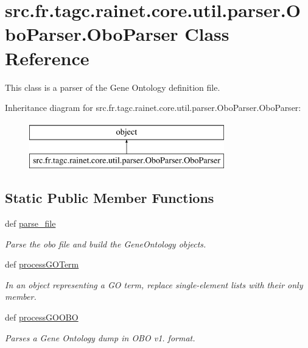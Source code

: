 \hypertarget{classsrc_1_1fr_1_1tagc_1_1rainet_1_1core_1_1util_1_1parser_1_1OboParser_1_1OboParser}{\section{src.\-fr.\-tagc.\-rainet.\-core.\-util.\-parser.\-Obo\-Parser.\-Obo\-Parser Class Reference}
\label{classsrc_1_1fr_1_1tagc_1_1rainet_1_1core_1_1util_1_1parser_1_1OboParser_1_1OboParser}
}


This class is a parser of the Gene Ontology definition file.  


Inheritance diagram for src.\-fr.\-tagc.\-rainet.\-core.\-util.\-parser.\-Obo\-Parser.\-Obo\-Parser\-:\begin{figure}[H]
\begin{center}
\leavevmode
\includegraphics[height=2.000000cm]{classsrc_1_1fr_1_1tagc_1_1rainet_1_1core_1_1util_1_1parser_1_1OboParser_1_1OboParser}
\end{center}
\end{figure}
\subsection*{Static Public Member Functions}
\begin{DoxyCompactItemize}
\item 
def \hyperlink{classsrc_1_1fr_1_1tagc_1_1rainet_1_1core_1_1util_1_1parser_1_1OboParser_1_1OboParser_afb086409368d83624cf8cf8e373649f1}{parse\-\_\-file}
\begin{DoxyCompactList}\small\item\em Parse the obo file and build the Gene\-Ontology objects. \end{DoxyCompactList}\item 
def \hyperlink{classsrc_1_1fr_1_1tagc_1_1rainet_1_1core_1_1util_1_1parser_1_1OboParser_1_1OboParser_abe87625326bc86eaadeb42ba20508b25}{process\-G\-O\-Term}
\begin{DoxyCompactList}\small\item\em In an object representing a G\-O term, replace single-\/element lists with their only member. \end{DoxyCompactList}\item 
def \hyperlink{classsrc_1_1fr_1_1tagc_1_1rainet_1_1core_1_1util_1_1parser_1_1OboParser_1_1OboParser_a7a8b017be1f9d2c735de4be149efc712}{process\-G\-O\-O\-B\-O}
\begin{DoxyCompactList}\small\item\em Parses a Gene Ontology dump in O\-B\-O v1. format. \end{DoxyCompactList}\end{DoxyCompactItemize}



